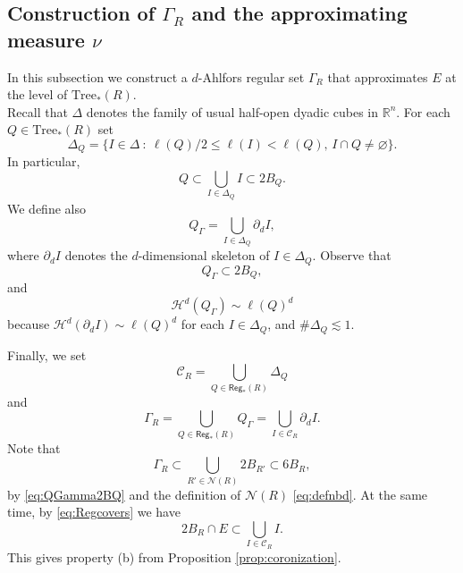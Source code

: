 \documentclass[11pt,reqno]{amsart}
\newcommand{\Tr}{\mathrm{Tree}}
\def\cC{{\mathscr{C}}}
\renewcommand{\d}{{\partial}}
\theoremstyle{definition}
\theoremstyle{remark}
\numberwithin{equation}{section}
\newcommand{\R}{\mathbb{R}}
\newcommand{\nbd}{\mathcal{N}}
\newcommand{\hd}{\mathcal{H}^d}
\newcommand{\Reg}{\mathsf{Reg}_*}
\theoremstyle{theorem}
\theoremstyle{definition}
\theoremstyle{remark}
\numberwithin{equation}{section}
\begin{document}
	\subsection{Construction of $\Gamma_R$ and the approximating measure $\nu$}\label{subsec:approx}
%
%
%
	In this subsection we construct a $d$-Ahlfors regular set $\Gamma_R$ that approximates $E$ at the level of $\Tr_*(R)$. \\
 
	Recall that $\Delta$ denotes the family of usual half-open dyadic cubes in $\R^n$. For each $Q\in\Tr_*(R)$ set
	\begin{equation*}
	\Delta_Q = \{I\in\Delta\ :\ \ell(Q)/2\le  \ell(I)<\ell(Q),\, I\cap Q\neq\varnothing\}.
	\end{equation*}
	In particular, 
	\begin{equation}\label{eq:DQsubset2BQ}
	Q\subset \bigcup_{I\in\Delta_Q} I\subset 2B_Q.
	\end{equation}
	We define also
	\begin{equation*}
	Q_{\Gamma} = \bigcup_{I\in\Delta_Q}\d_d I,
	\end{equation*}
	where $\d_d I$ denotes the $d$-dimensional skeleton of $I\in\Delta_Q$. Observe that
	\begin{equation}\label{eq:QGamma2BQ}
	Q_\Gamma\subset 2B_Q,
	\end{equation}
	and
	\begin{equation}\label{eq:QGammameas}
	\hd(Q_{\Gamma}) \sim \ell(Q)^d
	\end{equation}
	because $\hd(\d_d I)\sim \ell(Q)^d$ for each $I\in\Delta_Q$, and $\#\Delta_Q\lesssim 1$.
	
	Finally, we set
    \begin{equation*}
        \cC_R = \bigcup_{Q\in\Reg(R)}\Delta_Q
    \end{equation*}
    and
	\begin{equation*}
	\Gamma_R = \bigcup_{Q\in\Reg(R)} Q_{\Gamma} = \bigcup_{I\in\cC_R}\d_d I.
	\end{equation*}
	Note that 
	\begin{equation}\label{eq:Gamma6BR}
	\Gamma_R\subset \bigcup_{R'\in\nbd(R)}2B_{R'}\subset 6B_{R},
	\end{equation}
	by \eqref{eq:QGamma2BQ} and the definition of $\nbd(R)$ \eqref{eq:defnbd}. At the same time, by \eqref{eq:Regcovers} we have
    \begin{equation*}
        2B_R\cap E\subset \bigcup_{I\in\cC_R}I.
    \end{equation*}
    This gives property (b) from Proposition \ref{prop:coronization}.
\end{document}
